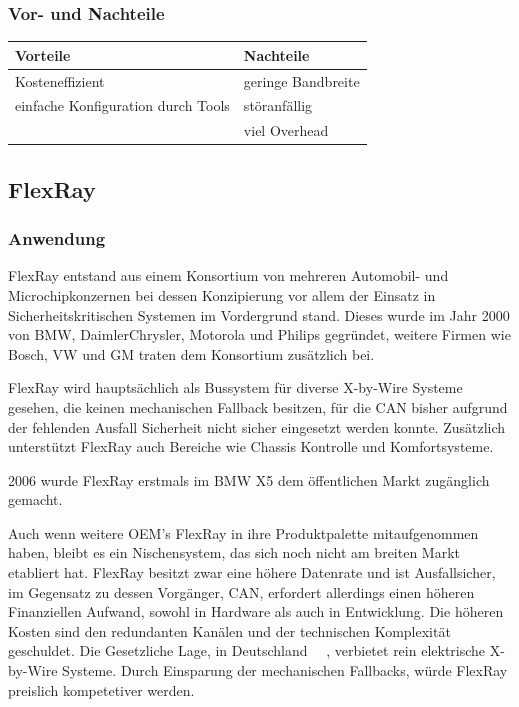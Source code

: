     \subsubsection{Vor- und Nachteile}

    \begin{center}
        \begin{tabular}{l|l}
            \textbf{Vorteile} & \textbf{Nachteile}\\
            \hline Kosteneffizient & geringe Bandbreite\\
            \hline einfache Konfiguration durch Tools & störanfällig\\
            \hline & viel Overhead\\
            \hline
        \end{tabular}            
    \end{center}

\subsection{FlexRay}
    \subsubsection{Anwendung}
    FlexRay entstand aus einem Konsortium von mehreren Automobil- und Microchipkonzernen bei
    dessen Konzipierung vor allem der Einsatz in Sicherheitskritischen Systemen im Vordergrund 
    stand. Dieses wurde im Jahr 2000 von BMW, DaimlerChrysler, Motorola und Philips gegründet,
    weitere Firmen wie Bosch, VW und GM traten dem Konsortium zusätzlich bei.

    FlexRay wird hauptsächlich als Bussystem für diverse X-by-Wire Systeme gesehen, die keinen 
    mechanischen Fallback besitzen, für die CAN bisher aufgrund der fehlenden Ausfall Sicherheit 
    nicht sicher eingesetzt werden konnte. Zusätzlich unterstützt FlexRay auch Bereiche wie Chassis
    Kontrolle und Komfortsysteme. 

    2006 wurde FlexRay erstmals im BMW X5 dem öffentlichen Markt zugänglich gemacht.
    ~\cite{reif2011bosch}

    Auch wenn weitere OEM’s FlexRay in ihre Produktpalette mitaufgenommen haben, bleibt es
    ein Nischensystem, das sich noch nicht am breiten Markt etabliert hat. FlexRay besitzt zwar eine
    höhere Datenrate und ist Ausfallsicher, im Gegensatz zu dessen Vorgänger, CAN, erfordert 
    allerdings einen höheren Finanziellen Aufwand, sowohl in Hardware als auch in Entwicklung.
    Die höheren Kosten sind den redundanten Kanälen und der technischen Komplexität geschuldet.
    Die Gesetzliche Lage, in Deutschland~\cite{LA_StVZO38}~\cite{LA_StVZO41}
    , verbietet rein elektrische X-by-Wire Systeme. Durch 
    Einsparung der mechanischen Fallbacks, würde FlexRay preislich kompetetiver werden.
    ~\cite{LA_FR1}
    ~\cite{LA_FR2}
    ~\cite{LA_FR3}
    ~\cite{LA_FR4}
    
